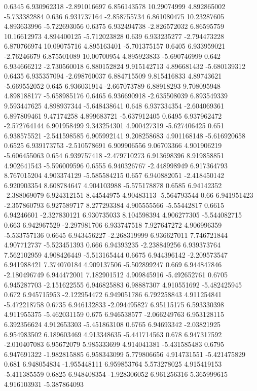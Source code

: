 {0.6345 6.930962318 -2.891016697 6.856143578 10.29074999 4.892865002 -5.733382884
0.636 6.931737164 -2.858755734 6.861080475 10.23287605 4.893633996 -5.722693056
0.6375 6.932494738 -2.826572032 6.86595759 10.16612973 4.894400125 -5.712023828
0.639 6.933235277 -2.794473228 6.870766974 10.09075716 4.895163401 -5.701375157
0.6405 6.933959021 -2.76246679 6.875501089 10.00700954 4.895923833 -5.690746999
0.642 6.934666212 -2.730560018 6.880152824 9.915142713 4.896681432 -5.680139312
0.6435 6.935357094 -2.698760037 6.884715509 9.815416833 4.89743621 -5.669552052
0.645 6.936031914 -2.667073789 6.88918293 9.708095948 4.898188177 -5.658985176
0.6465 6.936690918 -2.635508039 6.893549339 9.593447625 4.898937344 -5.648438641
0.648 6.937334354 -2.604069361 6.897809461 9.47174258 4.899683721 -5.637912405
0.6495 6.937962472 -2.572764144 6.901958499 9.343254301 4.900427319 -5.627406425
0.651 6.938575521 -2.541598585 6.905992141 9.208258683 4.901168148 -5.616920658
0.6525 6.939173753 -2.510578691 6.909906556 9.06703366 4.901906219 -5.606455063
0.654 6.939757418 -2.479710273 6.913698396 8.919858851 4.902641543 -5.596009596
0.6555 6.940326767 -2.448998949 6.917364793 8.767015204 4.903374129 -5.585584215
0.657 6.940882051 -2.418450142 6.920903354 8.608784647 4.904103988 -5.575178878
0.6585 6.94142352 -2.388069079 6.924312151 8.44544975 4.90483113 -5.564793544
0.66 6.941951423 -2.357860793 6.927589717 8.277293384 4.905555566 -5.55442817
0.6615 6.94246601 -2.327830121 6.930735033 8.104598394 4.906277305 -5.544082715
0.663 6.942967529 -2.297981706 6.933747518 7.927647272 4.906996359 -5.533757136
0.6645 6.943456227 -2.268319999 6.936627011 7.746721844 4.907712737 -5.523451393
0.666 6.94393235 -2.238849256 6.939373764 7.562102959 4.908426449 -5.513165444
0.6675 6.944396142 -2.209573547 6.941988421 7.374070184 4.909137506 -5.502899247
0.669 6.944847846 -2.180496749 6.944472001 7.182901512 4.909845916 -5.492652761
0.6705 6.945287703 -2.151622555 6.946825883 6.98887307 4.910551692 -5.482425945
0.672 6.945715953 -2.122954472 6.949051786 6.792258843 4.911254841 -5.472218758
0.6735 6.946132833 -2.094495827 6.95115175 6.593330398 4.911955375 -5.462031159
0.675 6.946538577 -2.066249763 6.953128115 6.392356624 4.912653303 -5.451863108
0.6765 6.94693342 -2.03821925 6.954983502 6.189603469 4.913348635 -5.441714563
0.678 6.947317592 -2.010407083 6.95672079 5.985333699 4.914041381 -5.431585483
0.6795 6.947691322 -1.982815885 6.958343099 5.779806656 4.914731551 -5.421475829
0.681 6.948054834 -1.955448111 6.959853764 5.573278025 4.915419153 -5.411385559
0.6825 6.948408354 -1.928306052 6.961256316 5.365999615 4.916103931 -5.387864093
}
